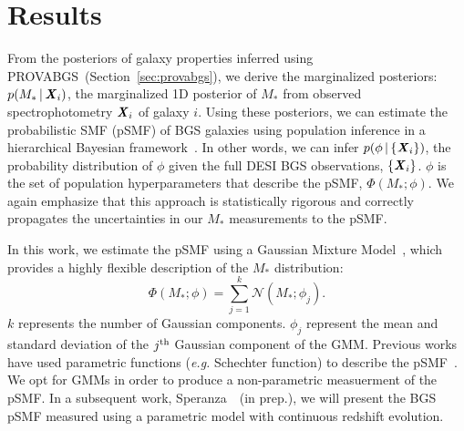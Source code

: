 \section{Results} \label{sec:results}
From the posteriors of galaxy properties inferred using
PROVABGS~(Section~\ref{sec:provabgs}), we derive the marginalized posteriors: 
$p(M_* \,|\, {\textbf{\textit{X}}_i})$, the marginalized 1D posterior of $M_*$ from
observed spectrophotometry ${\textbf{\textit{X}}_i}$ of galaxy $i$.
Using these posteriors, we can estimate the probabilistic SMF (pSMF) of BGS
galaxies using population inference in a hierarchical Bayesian 
framework~\citep[\emph{e.g.}][]{hogg2010, foreman-mackey2014, baronchelli2020}.
In other words, we can infer $p(\phi\,|\,\{{\textbf{\textit{X}}_i}\})$, the probability
distribution of $\phi$ given the full DESI BGS observations, $\{{\textbf{\textit{X}}_i}\}$. 
$\phi$ is the set of population hyperparameters that describe the pSMF,
$\Phi(M_*; \phi)$.
We again emphasize that this approach is statistically rigorous and correctly
propagates the uncertainties in our $M_*$ measurements to the pSMF. 


In this work, we estimate the pSMF using a Gaussian Mixture
Model~\citep[GMM;][]{press1992, mclachlan2000}, which provides a highly flexible
description of the $M_*$ distribution: 
\begin{equation}
    \Phi(M_*; \phi) = \sum\limits_{j=1}^{k} \mathcal{N}(M_*; \phi_j).
\end{equation} 
$k$ represents the number of Gaussian components. 
$\phi_j$ represent the mean and standard deviation of the $j^{\rm th}$ Gaussian
component of the GMM. 
Previous works have used parametric functions (\emph{e.g.} Schechter function)
to describe the pSMF~\citep{leja2019a}. 
We opt for GMMs in order to produce a non-parametric measuerment of the pSMF.
In a subsequent work, Speranza~\etal~(in prep.), we will present the BGS pSMF
measured using a parametric model with continuous redshift evolution.  


